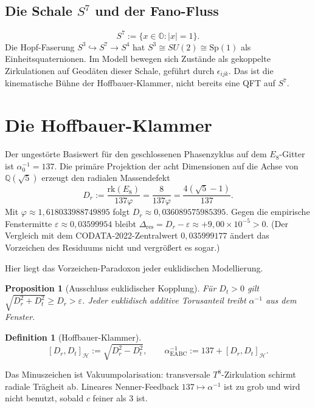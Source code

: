 \documentclass[11pt,a4paper]{article}
\newtheorem{proposition}[theorem]{Proposition}
\theoremstyle{definition}
\newtheorem{definition}[theorem]{Definition}
\theoremstyle{remark}
\numberwithin{equation}{section}
\begin{document}
\subsection{Die Schale $S^7$ und der Fano-Fluss}
\begin{equation}
S^7:=\{x\in\mathbb{O}:|x|=1\}.
\end{equation}
Die Hopf-Faserung $S^3\hookrightarrow S^7\to S^4$ hat $S^3\cong SU(2)\cong\mathrm{Sp}(1)$ als Einheitsquaternionen.
Im Modell bewegen sich Zustände als gekoppelte Zirkulationen auf Geodäten dieser Schale, geführt durch $\epsilon_{ijk}$.
Das ist die kinematische Bühne der Hoffbauer-Klammer, nicht bereits eine QFT auf $S^7$.

\section{Die Hoffbauer-Klammer}

Der ungestörte Basiswert für den geschlossenen Phasenzyklus auf dem $E_8$-Gitter ist $\alpha_0^{-1}=137$.
Die primäre Projektion der acht Dimensionen auf die Achse von $\mathbb{Q}(\sqrt{5})$ erzeugt den radialen Massendefekt
\begin{equation}
D_r:=\frac{\mathrm{rk}(E_8)}{137\varphi}=\frac{8}{137\varphi}=\frac{4(\sqrt{5}-1)}{137}.
\end{equation}
Mit $\varphi\approx 1{,}618033988749895$ folgt $D_r\approx 0{,}036089575985395$.
Gegen die empirische Fenstermitte $\varepsilon\approx 0{,}03599954$ bleibt
$\Delta_{\mathrm{res}}=D_r-\varepsilon\approx +9{,}00\times 10^{-5}>0$.
(Der Vergleich mit dem CODATA-2022-Zentralwert $0{,}035999177$ ändert das Vorzeichen des Residuums nicht und vergrößert es sogar.)

Hier liegt das Vorzeichen-Paradoxon jeder euklidischen Modellierung.

\begin{proposition}[Ausschluss euklidischer Kopplung]
\label{prop:eukl}
Für $D_t>0$ gilt $\sqrt{D_r^2+D_t^2}\ge D_r>\varepsilon$.
Jeder euklidisch additive Torusanteil treibt $\alpha^{-1}$ aus dem Fenster.
\end{proposition}

\begin{definition}[Hoffbauer-Klammer]
\label{def:hoff}
\[
[D_r,D_t]_{\mathcal{H}}:=\sqrt{D_r^2-D_t^2},\qquad
\alpha^{-1}_{\mathrm{EABC}}:=137+[D_r,D_t]_{\mathcal{H}}.
\]
\end{definition}
Das Minuszeichen ist Vakuumpolarisation: transversale $T^8$-Zirkulation schirmt radiale Trägheit ab.
Lineares Nenner-Feedback $137\mapsto\alpha^{-1}$ ist zu grob und wird nicht benutzt, sobald $c$ feiner als $3$ ist.
\end{document}
